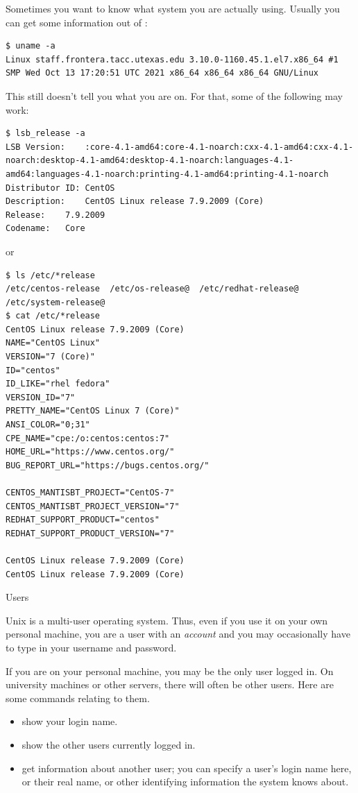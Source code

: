 Sometimes you want to know what system you are actually using.
Usually you can get some information out of :
\begin{lstlisting}
$ uname -a
Linux staff.frontera.tacc.utexas.edu 3.10.0-1160.45.1.el7.x86_64 #1 SMP Wed Oct 13 17:20:51 UTC 2021 x86_64 x86_64 x86_64 GNU/Linux
\end{lstlisting}
This still doesn't tell you what  you are on.
For that, some of the following may work:
\begin{lstlisting}
$ lsb_release -a
LSB Version:	:core-4.1-amd64:core-4.1-noarch:cxx-4.1-amd64:cxx-4.1-noarch:desktop-4.1-amd64:desktop-4.1-noarch:languages-4.1-amd64:languages-4.1-noarch:printing-4.1-amd64:printing-4.1-noarch
Distributor ID:	CentOS
Description:	CentOS Linux release 7.9.2009 (Core)
Release:	7.9.2009
Codename:	Core
\end{lstlisting}
or
\begin{lstlisting}
$ ls /etc/*release
/etc/centos-release  /etc/os-release@  /etc/redhat-release@  /etc/system-release@
$ cat /etc/*release
CentOS Linux release 7.9.2009 (Core)
NAME="CentOS Linux"
VERSION="7 (Core)"
ID="centos"
ID_LIKE="rhel fedora"
VERSION_ID="7"
PRETTY_NAME="CentOS Linux 7 (Core)"
ANSI_COLOR="0;31"
CPE_NAME="cpe:/o:centos:centos:7"
HOME_URL="https://www.centos.org/"
BUG_REPORT_URL="https://bugs.centos.org/"

CENTOS_MANTISBT_PROJECT="CentOS-7"
CENTOS_MANTISBT_PROJECT_VERSION="7"
REDHAT_SUPPORT_PRODUCT="centos"
REDHAT_SUPPORT_PRODUCT_VERSION="7"

CentOS Linux release 7.9.2009 (Core)
CentOS Linux release 7.9.2009 (Core)
\end{lstlisting}

 {Users}

Unix is a multi-user operating system. Thus, even if you use it
on your own personal machine, you are a user with an \emph{account}
and you may occasionally
have to type in your username and password.

If you are on your personal machine, you may be the only user logged
in. On university machines or other servers, there will often be other
users. Here are some commands relating to them.

\begin{itemize}
\item [\indexunix{whoami}] show your login name.
\item [\indexunix{who}] show the other users currently logged in.
\item [\indexunix{finger} {\tt otheruser}] get information about another user;
  you can specify a user's login name here, or their real name,
  or other identifying information the system knows about.
\end{itemize}

